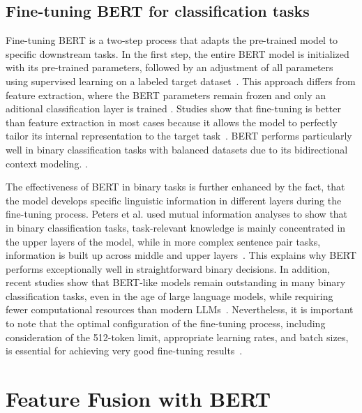 \subsection{Fine-tuning BERT for classification tasks}
Fine-tuning BERT is a two-step process that adapts the pre-trained model to specific downstream tasks. In the first step, the entire BERT model is initialized with its pre-trained parameters, followed by an adjustment of all parameters using supervised learning on a labeled target dataset~\parencite{devlin2019bert, sun2020finetuneberttextclassification}. This approach differs from feature extraction, where the BERT parameters remain frozen and only an aditional classification layer is trained \cite{peters-fintune}. Studies show that fine-tuning is better than feature extraction in most cases because it allows the model to perfectly tailor its internal representation to the target task~\parencite{peters-fintune, sun2020finetuneberttextclassification}.
BERT performs particularly well in binary classification tasks with balanced datasets due to its bidirectional context modeling. \parencite{bilal2022effectiveness}. 

The effectiveness of BERT in binary tasks is further enhanced by the fact, that the model develops specific linguistic information in different layers during the fine-tuning process. Peters et al. \cite{peters-fintune} used mutual information analyses to show that in binary classification tasks, task-relevant knowledge is mainly concentrated in the upper layers of the model, while in more complex sentence pair tasks, information is built up across middle and upper layers~\parencite{peters-fintune}. This explains why BERT performs exceptionally well in straightforward binary decisions.
In addition, recent studies show that BERT-like models remain outstanding in many binary classification tasks, even in the age of large language models, while requiring fewer computational resources than modern LLMs~\parencite{zhang2025bert}. Nevertheless, it is important to note that the optimal configuration of the fine-tuning process, including consideration of the 512-token limit, appropriate learning rates, and batch sizes, is essential for achieving very good fine-tuning results~\parencite{sun2020finetuneberttextclassification, bilal2022effectiveness}.

\section{Feature Fusion with BERT}


